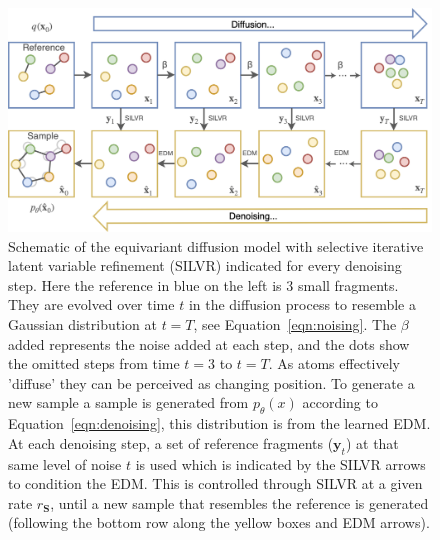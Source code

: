 \documentclass[journal=jacsat,manuscript=article]{achemso}
\begin{document}
\begin{figure}[h!]
    \centering
    \includegraphics[width=\textwidth]{paper/Figures/Fig1/Schematic_new.png}
    \caption{Schematic of the equivariant diffusion model with  selective iterative latent variable refinement (SILVR) indicated for every denoising step. Here the reference in blue on the left is 3 small fragments. They are evolved over time $t$ in the diffusion process to resemble a Gaussian distribution at $t=T$, see Equation~\ref{eqn:noising}. The $\beta$ added represents the noise added at each step, and the dots show the omitted steps from time $t=3$ to $t=T$. As atoms effectively 'diffuse' they can be perceived as changing position. To generate a new sample a sample is generated from $p_{\theta}(x)$ according to Equation~\ref{eqn:denoising}, this distribution is from the learned EDM. At each denoising step, a set of reference fragments ($\mathbf{y}_t$) at that same level of noise $t$ is used which is indicated by the SILVR arrows to condition the EDM. This is controlled through SILVR at a given rate $r_{\mathbf{S}}$, until a new sample that resembles the reference is generated (following the bottom row along the yellow boxes and EDM arrows).}
    \label{fig:schematic}
\end{figure}
\end{document}
